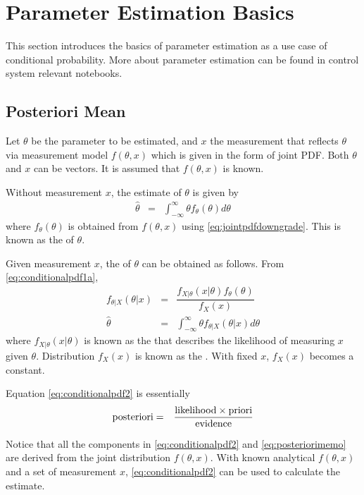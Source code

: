 \chapter{Parameter Estimation Basics} \label{ch:parameter-estimation}

This section introduces the basics of parameter estimation as a use case of conditional probability. More about parameter estimation can be found in control system relevant notebooks. 

\section{Posteriori Mean}

Let $\theta$ be the parameter to be estimated, and $x$ the measurement that reflects $\theta$ via measurement model $f(\theta, x)$ which is given in the form of joint PDF. Both $\theta$ and $x$ can be vectors. It is assumed that $f(\theta,x)$ is known. 

Without measurement $x$, the estimate of $\theta$ is given by
\begin{eqnarray}
	\hat{\theta} &=& \int_{-\infty}^{\infty} \theta f_\theta(\theta) d\theta \nonumber
\end{eqnarray}
where $f_\theta(\theta)$ is obtained from $f(\theta,x)$ using \eqref{eq:jointpdfdowngrade}. This is known as the  of $\theta$. 

Given measurement $x$, the  of $\theta$ can be obtained as follows. From \eqref{eq:conditionalpdf1a},
\begin{eqnarray}
	f_{\theta|X}(\theta|x) &=& \dfrac{f_{X|\theta}(x|\theta)f_\theta(\theta)}{f_X(x)} \label{eq:conditionalpdf2} \\
	\hat{\theta} &=& \int_{-\infty}^{\infty} \theta f_{\theta|X}(\theta|x) d\theta \label{eq:posterioriestimation}
\end{eqnarray}
where $f_{X|\theta}(x|\theta)$ is known as the  that describes the likelihood of measuring $x$ given $\theta$. Distribution $f_X(x)$ is known as the . With fixed $x$, $f_X(x)$ becomes a constant.

Equation \eqref{eq:conditionalpdf2} is essentially
\begin{eqnarray}
	\textup{posteriori} &=& \dfrac{\textup{likelihood}\times\textup{priori}}{\textup{evidence}} \label{eq:posteriorimemo}
\end{eqnarray} 

Notice that all the components in \eqref{eq:conditionalpdf2} and \eqref{eq:posteriorimemo} are derived from the joint distribution $f(\theta, x)$. With known analytical $f(\theta, x)$ and a set of measurement $x$, \eqref{eq:conditionalpdf2} can be used to calculate the estimate. 

